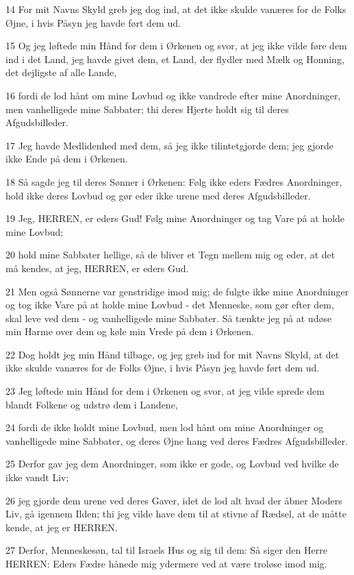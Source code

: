 \par 14 For mit Navns Skyld greb jeg dog ind, at det ikke skulde vanæres for de Folks Øjne, i hvis Påsyn jeg havde ført dem ud.
\par 15 Og jeg løftede min Hånd for dem i Ørkenen og svor, at jeg ikke vilde føre dem ind i det Land, jeg havde givet dem, et Land, der flydler med Mælk og Honning, det dejligste af alle Lande,
\par 16 fordi de lod hånt om mine Lovbud og ikke vandrede efter mine Anordninger, men vanhelligede mine Sabbater; thi deres Hjerte holdt sig til deres Afgudsbilleder.
\par 17 Jeg havde Medlidenhed med dem, så jeg ikke tilintetgjorde dem; jeg gjorde ikke Ende på dem i Ørkenen.
\par 18 Så sagde jeg til deres Sønner i Ørkenen: Følg ikke eders Fædres Anordninger, hold ikke deres Lovbud og gør eder ikke urene med deres Afgudsbilleder.
\par 19 Jeg, HERREN, er eders Gud! Følg mine Anordninger og tag Vare på at holde mine Lovbud;
\par 20 hold mine Sabbater hellige, så de bliver et Tegn mellem mig og eder, at det må kendes, at jeg, HERREN, er eders Gud.
\par 21 Men også Sønnerne var genstridige imod mig; de fulgte ikke mine Anordninger og tog ikke Vare på at holde mine Lovbud - det Menneske, som gør efter dem, skal leve ved dem - og vanhelligede mine Sabbater. Så tænkte jeg på at udøse min Harme over dem og køle min Vrede på dem i Ørkenen.
\par 22 Dog holdt jeg min Hånd tilbage, og jeg greb ind for mit Navns Skyld, at det ikke skulde vanæres for de Folks Øjne, i hvis Påsyn jeg havde ført dem ud.
\par 23 Jeg løftede min Hånd for dem i Ørkenen og svor, at jeg vilde sprede dem blandt Folkene og udstrø dem i Landene,
\par 24 fordi de ikke holdt mine Lovbud, men lod hånt om mine Anordninger og vanhelligede mine Sabbater, og deres Øjne hang ved deres Fædres Afgudsbilleder.
\par 25 Derfor gav jeg dem Anordninger, som ikke er gode, og Lovbud ved hvilke de ikke vandt Liv;
\par 26 jeg gjorde dem urene ved deres Gaver, idet de lod alt hvad der åbner Moders Liv, gå igennem Ilden; thi jeg vilde have dem til at stivne af Rædsel, at de måtte kende, at jeg er HERREN.
\par 27 Derfor, Menneskesøn, tal til Israels Hus og sig til dem: Så siger den Herre HERREN: Eders Fædre hånede mig ydermere ved at være troløse imod mig.
